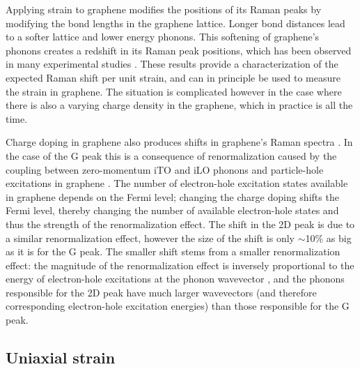 \documentclass[edeposit,fullpage,draftthesis]{uiucthesis2009}
\begin{document}
        Applying strain to graphene modifies the positions of its Raman peaks by modifying the bond
        lengths in the graphene lattice. Longer bond distances lead to a softer lattice and lower
        energy phonons. This softening of graphene's phonons creates a redshift in its Raman peak positions,
        which has been observed in many experimental studies 
        \cite{mohiuddin2009uniaxial, ni2008uniaxial, huang2009phonon, huang2010probing, yoon2011strain, ding2010stretchable, metzger2009biaxial}. These results provide a characterization of the expected Raman shift per unit
        strain, and can in principle be used to measure the strain in graphene. The situation is complicated however
        in the case where there is also a varying charge density in the graphene, which in practice is all the time.
        
        Charge doping in graphene also produces shifts in graphene's Raman spectra 
        \cite{casiraghi2007raman, yan2007electric, pisana2007breakdown, lazzeri2006nonadiabatic, das2008monitoring}. 
        In the case of the G peak this
        is a consequence of renormalization caused by the coupling between zero-momentum iTO and iLO phonons and
        particle-hole excitations in graphene \cite{yan2007electric, lazzeri2006nonadiabatic, pisana2007breakdown}.
        The number of electron-hole excitation states available in graphene depends on the Fermi level;
        changing the charge doping shifts the Fermi level, thereby changing the number of available
        electron-hole states and thus the strength of the renormalization effect.
        The shift in the 2D peak is due to a similar renormalization effect, however the 
        size of the shift is only $\sim$10\% as big as it is for the G peak. 
        The smaller shift stems from a smaller renormalization effect:
        the magnitude of the renormalization effect is inversely proportional to the energy of electron-hole
        excitations at the phonon wavevector \cite{yan2007electric}, and the phonons responsible for the 2D peak have much larger
        wavevectors (and therefore corresponding electron-hole excitation energies)
        than those responsible for the G peak.
        
        \subsection{Uniaxial strain}
        \label{sec:bg:uniaxial}
                    
\end{document}
